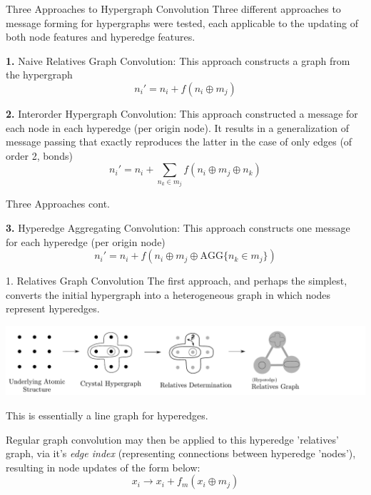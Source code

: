 \documentclass[11pt]{beamer}
\begin{document}
\begin{frame}{Three Approaches to Hypergraph Convolution}
Three different approaches to message forming for hypergraphs were tested, each applicable to the updating of both node features and hyperedge features.\pause

\medskip

\textbf{1.} Naive Relatives Graph Convolution: This approach constructs a graph from the hypergraph
$$
n_i' =  n_i + f(n_i \oplus m_j ) 
$$

\medskip\pause

\textbf{2.} Interorder Hypergraph Convolution: This approach constructed a message for each node in each hyperedge (per origin node). It results in a generalization of message passing that exactly reproduces the latter in the case of only edges (of order 2, bonds)
$$
n_i' =  n_i + \sum_{n_k \in m_j}f(n_i \oplus m_j\oplus n_k ) 
$$
\end{frame}

\begin{frame}{Three Approaches cont.}

\textbf{3.} Hyperedge Aggregating Convolution: This approach constructs one message for each hyperedge (per origin node)
$$
n_i' =  n_i + f(n_i \oplus m_j\oplus \text{AGG}\lbrace n_k\in m_j \rbrace ) 
$$
\end{frame}



\begin{frame}{1. Relatives Graph Convolution}
The first approach, and perhaps the simplest, converts the initial hypergraph into a heterogeneous graph in which nodes represent hyperedges. \pause 

\begin{center}
\includegraphics[scale=0.37]{relgraph_workflow_horiz.pdf}
\end{center}

This is essentially a line graph for hyperedges. \pause

Regular graph convolution may then be applied to this hyperedge 'relatives' graph, via it's \textit{edge index} (representing connections between hyperedge 'nodes'), resulting in node updates of the form below:
$$
x_i \rightarrow x_i + f_m(x_i\oplus m_j)
$$
\end{frame}
\end{document}
